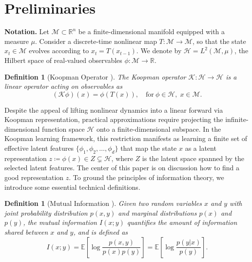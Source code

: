 \documentclass{article} %
\newtheorem{definition}[theorem]{Definition}
\begin{document}
\section{Preliminaries}

\textbf{Notation.} 
Let $\mathcal{M} \subset \mathbb{R}^n$ be a finite-dimensional manifold equipped with a measure $\mu$.  Consider a discrete-time nonlinear map $T: \mathcal{M} \to \mathcal{M}$, so that the state $x_t \in \mathcal{M}$ evolves according to $ x_t = T(x_{t-1})$.  We denote by $\mathcal{H} = L^2(\mathcal{M}, \mu)$, the Hilbert space of real-valued observables $\phi : \mathcal{M} \to \mathbb{R}$.

\begin{definition}[Koopman Operator \citep{koopman1931hamiltonian}] \label{Def:Koopman}
The \emph{Koopman operator} $\mathcal{K}: \mathcal{H} \to \mathcal{H}$ is a linear operator acting on observables as
\begin{equation} \label{def:koopman_operator}
    (\mathcal{K}\phi)(x) = \phi(T(x)), \quad \text{for} \ \phi \in \mathcal{H}, \; x \in \mathcal{M}.
\end{equation}
\end{definition}
Despite the appeal of lifting nonlinear dynamics into a linear forward via Koopman representation, practical approximations require projecting the infinite-dimensional function space \( \mathcal{H} \) onto a finite-dimensional subspace. In the Koopman learning framework, this restriction manifests as learning a finite set of effective latent features \( \{ \phi_1, \phi_2, \dots, \phi_d \} \) that map the state \( x \) as a latent representation \( z \coloneqq \phi(x) \in Z \subsetneq \mathcal{H} \), where \( Z \) is the latent space spanned by the selected latent features. The center of this paper is on discussion how to find a good representation $z$.  To ground the principles of information theory, we introduce some essential technical definitions. 

\begin{definition}[Mutual Information \citep{mackay2003information}] \label{def:mutual_info}
Given two random variables \(x\) and \(y\) with joint probability distribution \(p(x,y)\) and marginal distributions \(p(x)\) and \(p(y)\), the \emph{mutual information} \(I(x;y)\) quantifies the amount of information shared between \(x\) and \(y\), and is defined as
\[
I(x;y) = \mathbb{E} [\log \frac{p(x,y)}{p(x) p(y)} ] = \mathbb{E} [\log \frac{p(y| x)}{p(y)} ].
\]
\end{definition}
\end{document}
